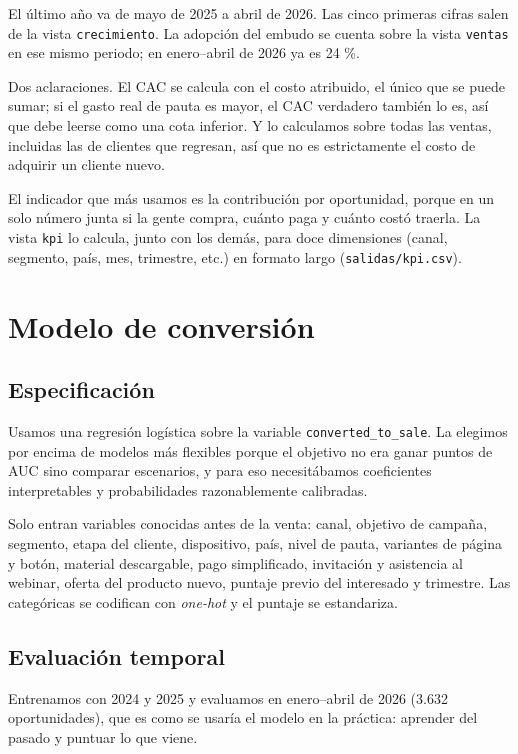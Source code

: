 \documentclass[11pt,letterpaper]{article}
\begin{document}
El último año va de mayo de 2025 a abril de 2026. Las cinco primeras cifras salen de la vista
\texttt{crecimiento}. La adopción del embudo se cuenta sobre la vista \texttt{ventas} en ese mismo
periodo; en enero--abril de 2026 ya es 24 \%.

Dos aclaraciones. El CAC se calcula con el costo atribuido, el único que se puede sumar; si el
gasto real de pauta es mayor, el CAC verdadero también lo es, así que debe leerse como una cota inferior. Y lo calculamos sobre todas las ventas, incluidas las de clientes que
regresan, así que no es estrictamente el costo de adquirir un cliente nuevo.

El indicador que más usamos es la contribución por oportunidad, porque en un solo número junta si la gente
compra, cuánto paga y cuánto costó traerla. La vista \texttt{kpi} lo calcula, junto con los demás, para doce
dimensiones (canal, segmento, país, mes, trimestre, etc.) en formato largo (\texttt{salidas/kpi.csv}).

\section{Modelo de conversión}

\subsection{Especificación}

Usamos una regresión logística sobre la variable \texttt{converted\_to\_sale}. La elegimos por encima de
modelos más flexibles porque el objetivo no era ganar puntos de AUC sino comparar escenarios, y para eso
necesitábamos coeficientes interpretables y probabilidades razonablemente calibradas.

Solo entran variables conocidas antes de la venta: canal, objetivo de campaña, segmento, etapa del cliente,
dispositivo, país, nivel de pauta, variantes de página y botón, material descargable, pago simplificado,
invitación y asistencia al webinar, oferta del producto nuevo, puntaje previo del interesado y trimestre. Las
categóricas se codifican con \textit{one-hot} y el puntaje se estandariza.

\subsection{Evaluación temporal}

Entrenamos con 2024 y 2025 y evaluamos en enero--abril de 2026 (3.632 oportunidades), que es como se usaría el
modelo en la práctica: aprender del pasado y puntuar lo que viene.
\end{document}
